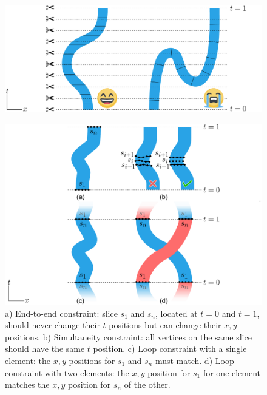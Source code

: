 \begin{figure}
\centering
\includegraphics[width=1.0\textwidth]{figures/animationpak/monotonicity.pdf} 
\caption[An illustration of desired and undesired deformation of an element]
{\label{fig_monotonicity} 
}
\end{figure}

\begin{figure}
\centering
\includegraphics[width=1.0\textwidth]{figures/animationpak/constraints.pdf} 
\caption[Constraints]
{\label{fig_animationpak_constraints} 
a) End-to-end constraint: 
slice $s_1$ and $s_n$, located at 
$t = 0$ and $t = 1$,  should never change their $t$ positions but can change their $x, y$ positions. 
b) Simultaneity constraint: all vertices on the same slice should have the same $t$ position.
c) Loop constraint with a single element: the $x,y$ positions for $s_1$ and $s_n$ must match.
d) Loop constraint with two elements: the $x, y$ position for $s_1$  
for one element matches the $x, y$ position for $s_n$ of the other.
}
\end{figure}

